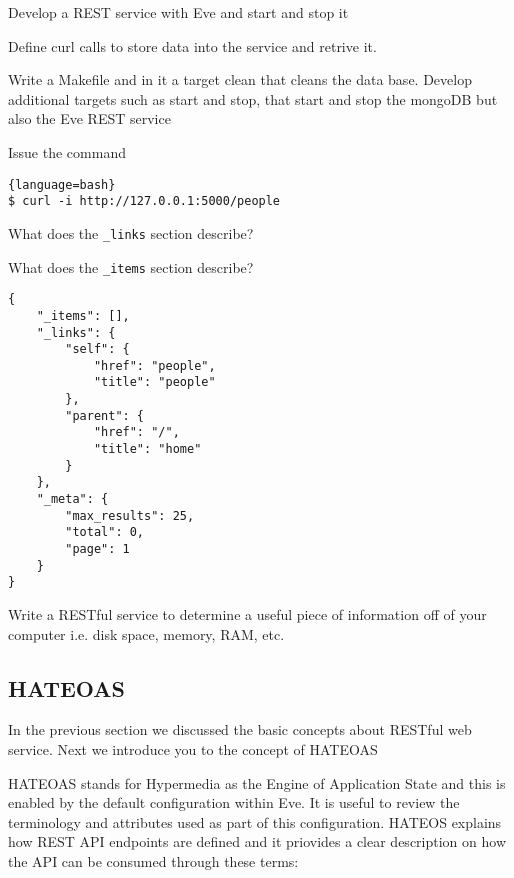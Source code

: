 \begin{exercise}
Develop a REST service with Eve and start and stop it
\end{exercise}

\begin{exercise}
Define curl calls to store data into the service and retrive it.
\end{exercise}

\begin{exercise}
Write a Makefile and in it a target clean that cleans the data
base. Develop additional targets such as start and stop, that start
and stop the mongoDB but also the Eve REST service
\end{exercise}


\begin{exercise}
Issue the command

\begin{lstlisting}{language=bash}
$ curl -i http://127.0.0.1:5000/people
\end{lstlisting}

What does the \verb|_links| section describe?

What does the \verb|_items| section describe?

\begin{lstlisting}
{
    "_items": [],
    "_links": {
        "self": {
            "href": "people",
            "title": "people"
        },
        "parent": {
            "href": "/",
            "title": "home"
        }
    },
    "_meta": {
        "max_results": 25,
        "total": 0,
        "page": 1
    }
}
\end{lstlisting} 
\end{exercise}


\begin{exercise}
Write a RESTful service to determine a useful piece of information off
of your computer i.e. disk space, memory, RAM, etc.
\end{exercise}


\subsection{HATEOAS}\label{s:hateoas}

In the previous section we discussed the basic concepts about RESTful
web service. Next we introduce you to the concept of HATEOAS

HATEOAS stands for Hypermedia as the Engine of Application State and
this is enabled by the default configuration within Eve. It is useful
to review the terminology and attributes used as part of this
configuration. HATEOS explains how REST API endpoints are defined and it
priovides a clear description on how the API can be consumed through
these terms:

